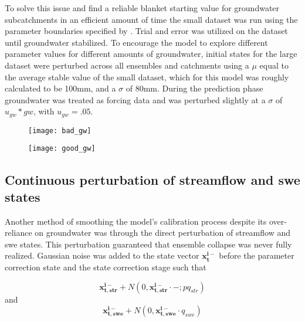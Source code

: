 To solve this issue and find a reliable blanket starting value for groundwater subcatchments in an efficient amount of time the small dataset was run using the parameter boundaries specified by \cite{Maneta2008}. Trial and error was utilized on the dataset until groundwater stabilized. To encourage the model to explore different parameter values for different amounts of groundwater, initial states for the large dataset were perturbed across all ensembles and catchments using a $\mu$ equal to the average stable value of the small dataset, which for this model was roughly calculated to be 100mm, and a $\sigma$ of 80mm. During the prediction phase groundwater was treated as forcing data and was perturbed slightly at a $\sigma$ of $u_{gw} * gw$, with $u_{gw} = .05$.

\begin{figure}
\centering
\begin{minipage}{.5\textwidth}
  \centering
  \texttt{[image: bad\_gw]}
  \label{fig:bad_gw}
\end{minipage}%
\begin{minipage}{.5\textwidth}
  \centering
  \texttt{[image: good\_gw]}
  \label{fig:good_gw}
\end{minipage}
\end{figure}


\subsection{Continuous perturbation of streamflow and swe states}

Another method of smoothing the model's calibration process despite its over-reliance on groundwater was through the direct perturbation of streamflow and swe states. This perturbation guaranteed that ensemble collapse was never fully realized. Gaussian noise was added to the state vector $\mathbf{x^{i-}_{t}}$ before the parameter correction state and the state correction stage such that

\begin{equation}\label{eq:perturbation_str}
\mathbf{x^{i-}_{t,str}} + N(0,\mathbf{x^{i-}_{t,str}} \cdot -;pq_{str})
\end{equation}
and
\begin{equation}\label{eq:perturbation_swe}
\mathbf{x^{i-}_{t,swe}} + N(0,\mathbf{x^{i-}_{t,swe}} \cdot q_{swe})
\end{equation}

